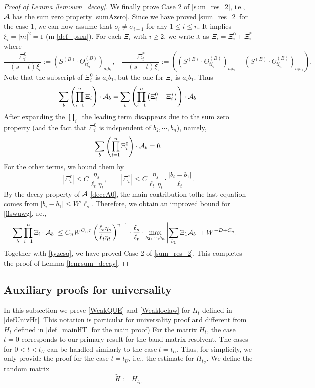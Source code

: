 \documentclass[10pt,reqno]{article}
\theoremstyle{plain} %
\theoremstyle{remark}
\numberwithin{equation}{section}
\begin{document}
\begin{proof}[Proof of Lemma \ref{lem:sum_decay}]
We finally  prove Case 2 of \eqref{sum_res_2}, i.e., $\cal A$ has the sum zero property \eqref{sumAzero}. 
Since we have proved \eqref{sum_res_2} for the case 1,  we can now assume  that $\sigma_i\ne \sigma_{i+1}$ for any $1\le i\le n$. It implies $\xi_i=|m|^2=1$ (in \eqref{def_psixi}).    For each $\Xi_i$ with $i\ge 2$,  we write it as
$\Xi_i=\Xi^0_i+\Xi^*_i$ where
$$
\frac{\Xi^0_i}{-(s-t)\xi_i }:= \left(S^{(B)}\cdot \Theta^{(B)}_{t \xi_i}\right)_{a_ib_1},\quad
\frac{\Xi^*_i}{-(s-t)\xi_i }:= \left(\left(S^{(B)}\cdot \Theta^{(B)}_{t \xi_i}\right)_{a_ib_i}-\left(S^{(B)}\cdot \Theta^{(B)}_{t \xi_i}\right)_{a_ib_1}\right).
$$
Note that the subscript of $\Xi^0_i$ is $a_ib_1$, but the one for $\Xi_i$ is $a_ib_1$.  Thus 
$$\sum_{\textbf{b}}   \left(\prod_{i=1}^n  \Xi_i\right)  \cdot 
{\cal A}_{\textbf{b}}=\sum_{\textbf{b}} 
\left(\prod_{i=1}^n  \left(\Xi^0_i+  \Xi^*_i \right)\right)\cdot 
{\cal A}_{\textbf{b}}.
$$
After expanding the $\prod_i$, the leading term disappears due to the sum zero property (and the fact that $\Xi_i^0$ is independent of  $b_2,\cdots, b_n$), namely,  
$$
\sum_{\textbf{b}}
\left(\prod_{i=1}^n \Xi^0_i\right)\cdot {\cal A}_{\textbf{b}}=0.
$$
For the other terms, we bound them by 
$$
\left|\Xi_i^0\right|\le C\frac{\eta_s}{\ell_t\eta_t}, \quad \quad   \left|\Xi_i^*\right|\le C\frac{\eta_s}{\ell _t\,\eta_t}\cdot \frac{|b_i-b_1|}{\ell_t}.
$$
By the decay  property of $\cal A$  \eqref{deccA0},  the main contribution tothe last equation comes from $|b_i-b_1|\le W^\tau \ell_s$. Therefore, we obtain an improved bound for  \eqref{llswuwg}, i.e., 
\begin{align}\label{llswuwg2}
  \sum_{\textbf{b}}   \prod_{i=1}^n  \Xi_i  \cdot 
{\cal A}_{\textbf{b}}
\;\le\; & C_n W^{C_n\tau} \left(\frac{\ell_s \eta_s}{\ell_t \eta_t} \right)^{n-1} \cdot \frac{\ell_s}{\ell_t}\cdot  \max_{b_2,\cdots, b_n}  \left|\sum_{b_1 }\Xi_1 {\cal A}_{\textbf{b}}\right|+W^{-D+C_n}. 
\end{align}
Together with \eqref{tyzcsq}, we have proved Case 2 of   \eqref{sum_res_2}. This completes the proof of Lemma \ref{lem:sum_decay}. 
 
\end{proof}

\subsection{Auxiliary proofs for universality}\label{Apu}

In this subsection we prove \eqref{WeakQUE} and \eqref{Weakloclaw} for $H_t$ defined in \eqref{defUnivHt}. This notation is particular for universality proof and different from $H_t$ defined in \eqref{def_mainHT} for the main proof) For the matrix $H_t$, the case $t=0$ corresponds to our primary result for the band matrix resolvent. The cases for $0 < t < t_U$ can be handled similarly to the case $t = t_U$. Thus, for simplicity, we only provide the proof for the case $t = t_U$, i.e., the estimate for $H_{t_U}$. We define the random matrix \begin{equation}\label{defwtHHtu}
     \widetilde{H} := H_{t_U}
\end{equation}
 
\end{document}
